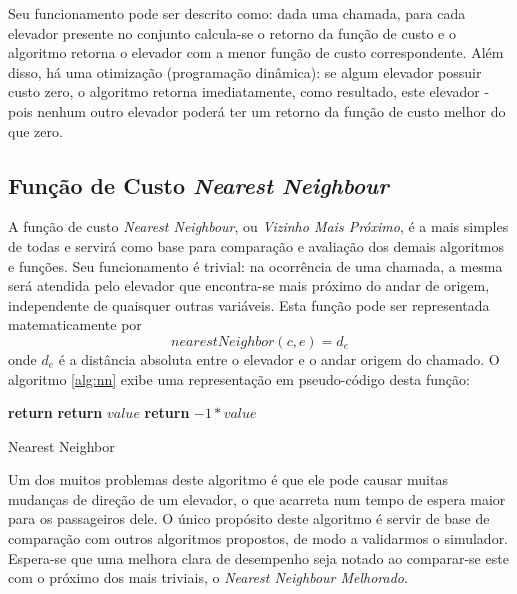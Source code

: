Seu funcionamento pode ser descrito como: dada uma chamada, para cada elevador
presente no conjunto calcula-se o retorno da função de custo e o algoritmo
retorna o elevador com a menor função de custo correspondente. Além disso, há
uma otimização (programação dinâmica): se algum elevador possuir custo zero, o
algoritmo retorna imediatamente, como resultado, este elevador - pois nenhum
outro elevador poderá ter um retorno da função de custo melhor do que zero.

\subsection{\label{sec:ai:nn}Função de Custo \textit{Nearest Neighbour}}

A função de custo \textit{Nearest Neighbour}, ou \textit{Vizinho Mais Próximo},
é a mais simples de todas e servirá como base para comparação e avaliação dos
demais algoritmos e funções. Seu funcionamento é trivial: na ocorrência de uma
chamada, a mesma será atendida pelo elevador que encontra-se mais próximo do
andar de origem, independente de quaisquer outras variáveis. Esta função pode
ser representada matematicamente por \[nearestNeighbor(c, e) = d_{e}\] onde
$d_{e}$ é a distância absoluta entre o elevador e o andar origem do chamado. O
algoritmo \ref{alg:nn} exibe uma representação em pseudo-código desta função:

\begin{algorithm}[htb]
\begin{center}
\begin{algorithmic}[1]
  \State \textbf{return} 
\EndFunction
\Statex
{}
    \State \textbf{return} $value$
  \EndIf
  \State \textbf{return} $-1 * value$
\EndFunction
\end{algorithmic}
\end{center}
\caption
   {\label{alg:nn}Nearest Neighbor}
\end{algorithm}

Um dos muitos problemas deste algoritmo é que ele pode causar muitas mudanças de
direção de um elevador, o que acarreta num tempo de espera maior para os
passageiros dele. O único propósito deste algoritmo é servir de base de
comparação com outros algoritmos propostos, de modo a validarmos o simulador.
Espera-se que uma melhora clara de desempenho seja notado ao comparar-se este
com o próximo dos mais triviais, o \textit{Nearest Neighbour Melhorado}.

